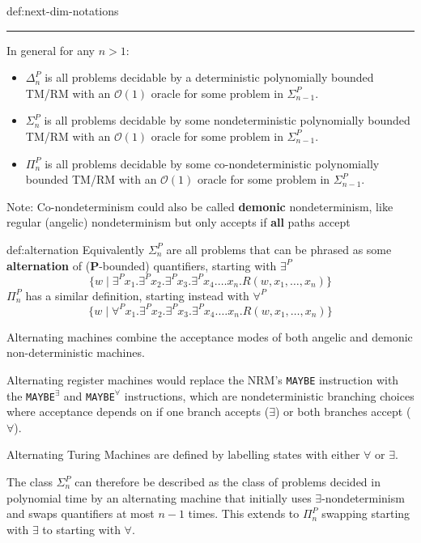 \documentclass[landscape, 8pt]{extarticle}
\begin{document}
\begin{multicols}{3}
\begin{dfn}{def:next-dim-notations}{}
\vspace{-5pt}
\noindent\rule{\textwidth}{0.2pt}
In general for any $n>1$:
\begin{itemize}
    \item $\Delta_n^P$ is all problems decidable by a deterministic polynomially bounded TM/RM with an $\mathcal{O}(1)$ oracle for some problem in $\Sigma_{n-1}^P$.
    \item $\Sigma_n^P$ is all problems decidable by some nondeterministic polynomially bounded TM/RM with an $\mathcal{O}(1)$ oracle for some problem in $\Sigma_{n-1}^P$.
    \item $\Pi_n^P$ is all problems decidable by some co-nondeterministic polynomially bounded TM/RM with an $\mathcal{O}(1)$ oracle for some problem in $\Sigma_{n-1}^P$.
\end{itemize}
Note: Co-nondeterminism could also be called \textbf{demonic} nondeterminism, like regular (angelic) nondeterminism but only accepts if \textbf{all} paths accept
\end{dfn}


\begin{dfn}[Alternation]{def:alternation}{}
Equivalently $\Sigma^{P}_{n}$ are all problems that can be phrased as some \textbf{alternation} of (\textbf{P}-bounded) quantifiers, starting with $\exists^{P}$
\[\{ w \mid \exists^{P} x_{1} . \exists^{P} x_{2} . \exists^{P} x_{3} . \exists^{P} x_{4} . \dots x_{n} . R(w, x_{1}, \dots, x_{n})\}\]
$\Pi_n^P$ has a similar definition, starting instead with $\forall^P$
\[\{ w \mid \forall^{P} x_{1} . \exists^{P} x_{2} . \exists^{P} x_{3} . \exists^{P} x_{4} . \dots x_{n} . R(w, x_{1}, \dots, x_{n})\}\]

Alternating machines combine the acceptance modes of both angelic and demonic non-deterministic machines.

Alternating register machines would replace the NRM's \texttt{MAYBE} instruction with the \texttt{MAYBE}$^\exists$ and \texttt{MAYBE}$^\forall$ instructions, which are nondeterministic branching choices where acceptance depends on if one branch accepts ($\exists$) or both branches accept ($\forall$).

Alternating Turing Machines are defined by labelling states
with either $\forall$ or $\exists$.

The class $\Sigma_n^P$ can therefore be described as the class of problems decided in polynomial time by an alternating machine that initially uses $\exists$-nondeterminism and swaps quantifiers at most $n-1$ times. This extends to $\Pi_n^P$ swapping starting with $\exists$ to starting with $\forall$.
\end{dfn}


\end{multicols}
\end{document}
